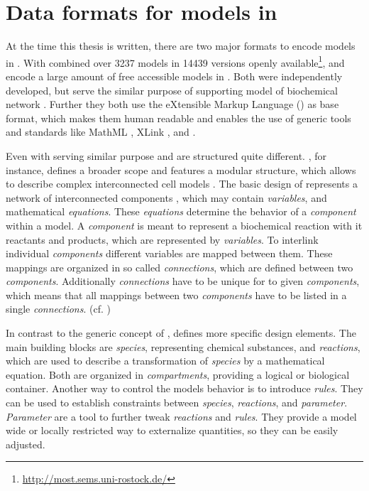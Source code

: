 \section{Data formats for models in \sysbio}
	\label{sec:background:formats}
	
	At the time this thesis is written, there are two major formats to encode models in \sysbio. With combined over 3237 models in 14439 versions openly available\footnote{\url{http://most.sems.uni-rostock.de/}}, \sbml and \cellml encode a large amount of free accessible models in \sysbio.
	Both were independently developed, but serve the similar purpose of supporting model of biochemical network \citep{Cuellar2003}. Further they both use the eXtensible Markup Language \citep{Bray1998} (\xml) as base format, which makes them human readable and enables the use of generic \xml tools and standards \citep{Cuellar2003,Hucka2003} like MathML \citep{Carlisle2003}, XLink \citep{DeRose2010}, and \rdf \citep{Lassila1998}.
	
	Even with serving similar purpose \sbml and \cellml are structured quite different.
	\cellml, for instance, defines a broader scope and features a modular structure, which allows to describe complex interconnected cell models \citep{Cuellar2003}.
	The basic design of \cellml represents a network of interconnected components \citep{Cuellar2003}, which may contain \emph{variables}, and mathematical \emph{equations}. These \emph{equations} determine the behavior of a \emph{component} within a model.
	A \emph{component} is meant to represent a biochemical reaction with it reactants and products, which are represented by \emph{variables}.
	To interlink individual \emph{components} different variables are mapped between them. These mappings are organized in so called \emph{connections}, which are defined between two \emph{components}. Additionally \emph{connections} have to be unique for to given \emph{components}, which means that all mappings between two \emph{components} have to be listed in a single \emph{connections}. (cf. \citet{Cuellar2003})
	
	In contrast to the generic concept of \cellml, \sbml defines more specific design elements.
	The main building blocks are \emph{species}, representing chemical substances, and \emph{reactions}, which are used to describe a transformation of \emph{species} by a mathematical equation. 
	Both are organized in \emph{compartments}, providing a logical or biological container. 
	Another way to control the models behavior is to introduce \emph{rules}. They can be used to establish constraints between \emph{species}, \emph{reactions}, and \emph{parameter}.
	\emph{Parameter} are a tool to further tweak \emph{reactions} and \emph{rules}. They provide a model wide or locally restricted way to externalize quantities, so they can be easily adjusted.
	
